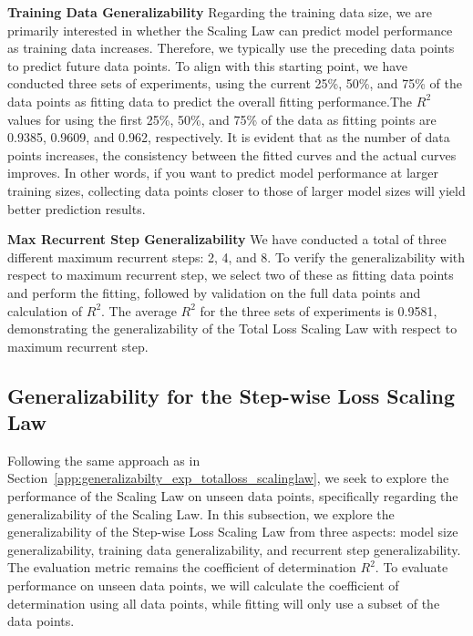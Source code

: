 \documentclass[]{bytedance_seed}
\newcommand{\1}{\mathbf{1}}
\begin{document}
\textbf{Training Data Generalizability} Regarding the training data size, we are primarily interested in whether the Scaling Law can predict model performance as training data increases. Therefore, we typically use the preceding data points to predict future data points. To align with this starting point, we have conducted three sets of experiments, using the current 25\%, 50\%, and 75\% of the data points as fitting data to predict the overall fitting performance.The $R^2$ values for using the first 25\%, 50\%, and 75\% of the data as fitting points are 0.9385, 0.9609, and 0.962, respectively. It is evident that as the number of data points increases, the consistency between the fitted curves and the actual curves improves. In other words, if you want to predict model performance at larger training sizes, collecting data points closer to those of larger model sizes will yield better prediction results.

\textbf{Max Recurrent Step Generalizability} We have conducted a total of three different maximum recurrent steps: 2, 4, and 8. To verify the generalizability with respect to maximum recurrent step, we select two of these as fitting data points and perform the fitting, followed by validation on the full data points and calculation of $R^2$. The average $R^2$ for the three sets of experiments is 0.9581, demonstrating the generalizability of the Total Loss Scaling Law with respect to maximum recurrent step.

\subsection{Generalizability for the Step-wise Loss Scaling Law}
\label{app:generalizabilty_exp_stepwiseloss_scalinglaw}

Following the same approach as in Section~\ref{app:generalizabilty_exp_totalloss_scalinglaw}, we seek to explore the performance of the Scaling Law on unseen data points, specifically regarding the generalizability of the Scaling Law. In this subsection, we explore the generalizability of the Step-wise Loss Scaling Law from three aspects: model size generalizability, training data generalizability, and recurrent step generalizability. The evaluation metric remains the coefficient of determination $R^2$. To evaluate performance on unseen data points, we will calculate the coefficient of determination using all data points, while fitting will only use a subset of the data points.
\end{document}
